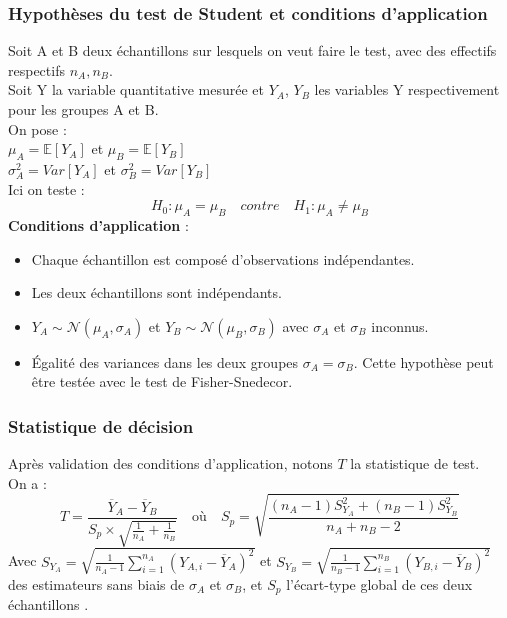 \documentclass[12pt,a4paper]{article}
\begin{document}
	\subsubsection{Hypothèses du test de Student et conditions d'application}
	Soit A et B deux échantillons sur lesquels on veut faire le test, avec des effectifs respectifs $n_A, n_B$.\\
	Soit Y la variable quantitative mesurée et $Y_A$, $Y_B$ les variables Y respectivement pour les groupes A et B.\\
	
	On pose : \\
	
	\noindent
	$\mu_A = \mathbb{E}[Y_A]$ et $\mu_B = \mathbb{E}[Y_B]$\\
	
	\noindent
	$\sigma_A^2 = Var[Y_A]$ et $\sigma_B^2 = Var[Y_B]$\\
	
	Ici on teste :
	\begin{equation*}
		H_0 : \mu_A = \mu_B \quad contre \quad H_1 : \mu_A \neq \mu_B
	\end{equation*}
	\textbf{Conditions d'application} \cite{poulin2023} : 
	\begin{itemize}[label=$\bullet$]
		\item Chaque échantillon est composé d'observations indépendantes.
		\item Les deux échantillons sont indépendants.
		\item $Y_A \sim \mathcal{N}(\mu_A,\sigma_A)$ et $Y_B \sim \mathcal{N}(\mu_B,\sigma_B)$ avec $\sigma_A$ et $\sigma_B$ inconnus.
		\item Égalité des variances dans les deux groupes $\sigma_A = \sigma_B$. Cette hypothèse peut être testée avec le test de Fisher-Snedecor.
	\end{itemize}
	
	\subsubsection{Statistique de décision}
	Après validation des conditions d'application, notons \( T \) la statistique de test.\\
	On a :
	\begin{equation}
		T = \frac{\overline{Y}_A - \overline{Y}_B}{S_p \times \sqrt{\frac{1}{n_A} + \frac{1}{n_B}}}\quad \text{où} \quad S_p = \sqrt{\frac{(n_A - 1)S_{Y_A}^2 + (n_B - 1)S_{Y_B}^2}{n_A + n_B - 2}}
	\end{equation}
	Avec \( S_{Y_A} = \sqrt{\frac{1}{n_A - 1}\sum_{i=1}^{n_A}(Y_{A,i} - \overline{Y}_A)^2} \) et \( S_{Y_B} = \sqrt{\frac{1}{n_B - 1}\sum_{i=1}^{n_B}(Y_{B,i} - \overline{Y}_B)^2} \) des estimateurs sans biais de \(\sigma_A\) et \(\sigma_B\), et \( S_p \) l'écart-type global de ces deux échantillons \cite{wikipedia_ttest}.\\
	
\end{document}
